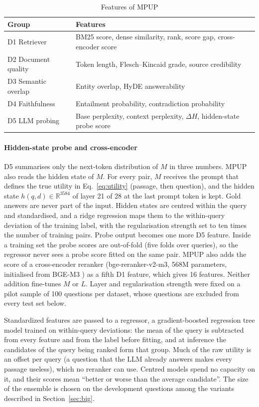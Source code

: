 \documentclass[preprint,12pt,authoryear]{elsarticle}
\begin{document}
\begin{table}[htbp]
    \centering
    \caption{Features of MPUP}
    \label{tab:mpup_features}
    \begin{tabularx}{\columnwidth}{lX}
        \toprule
        \textbf{Group} & \textbf{Features} \\
        \midrule
        D1 Retriever & BM25 score, dense similarity, rank, score gap, cross-encoder score \\
        D2 Document quality & Token length, Flesch--Kincaid grade, source credibility \\
        D3 Semantic overlap & Entity overlap, HyDE answerability \\
        D4 Faithfulness & Entailment probability, contradiction probability \\
        D5 LLM probing & Base perplexity, context perplexity, $\Delta H$, hidden-state probe score \\
        \bottomrule
    \end{tabularx}
\end{table}

\paragraph{Hidden-state probe and cross-encoder} D5 summarises only the next-token distribution of $M$ in three numbers. MPUP also reads the hidden state of $M$. For every pair, $M$ receives the prompt that defines the true utility in Eq.~\eqref{eq:utility} (passage, then question), and the hidden state $h(q,d)\in\mathbb{R}^{3584}$ of layer 21 of 28 at the last prompt token is kept. Gold answers are never part of the input. Hidden states are centred within the query and standardised, and a ridge regression maps them to the within-query deviation of the training label, with the regularisation strength set to ten times the number of training pairs. Probe output becomes one more D5 feature. Inside a training set the probe scores are out-of-fold (five folds over queries), so the regressor never sees a probe score fitted on the same pair. MPUP also adds the score of a cross-encoder reranker (bge-reranker-v2-m3, 568M parameters, initialised from BGE-M3 \citep{chen2024m3}) as a fifth D1 feature, which gives 16 features. Neither addition fine-tunes $M$ or $L$. Layer and regularisation strength were fixed on a pilot sample of 100 questions per dataset, whose questions are excluded from every test set below.

Standardized features are passed to a regressor, a gradient-boosted regression tree model trained on within-query deviations: the
mean of the query is subtracted from every feature and from the label
before fitting, and at inference the candidates of the query being ranked
form that group. Much of the raw utility is an offset per query
(a question that the LLM already answers makes every passage useless),
which no reranker can use. Centred models spend no capacity on it, and their scores mean ``better or worse than the average candidate''. The
size of the ensemble is chosen on the development questions among the variants described in Section~\ref{sec:big}.
\end{document}
